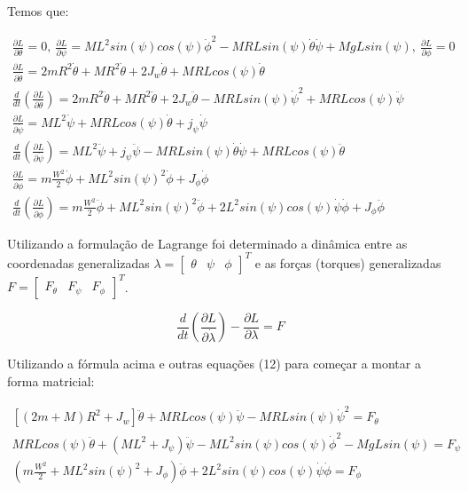 \documentclass[10pt]{article}
\begin{document}
\quad Temos que:

\begin{equation}
\begin{gathered}
    \frac{\partial L}{ \partial \theta} = 0, \ \frac{\partial L}{ \partial \psi} = ML^2sin(\psi)cos(\psi)\dot{\phi}^2 - MRLsin(\psi)\dot{\theta}\dot{\psi} + MgLsin(\psi), \ \frac{\partial L}{ \partial \phi} = 0 \\
    \frac{\partial L}{ \partial \dot{\theta}} = 2mR^2\dot{\theta} + MR^2\dot{\theta} + 2J_w\dot{\theta} + MRLcos(\psi)\dot{\theta} \\
    \frac{d}{dt} \left(\frac{\partial L}{ \partial \dot{\theta}}\right) = 2mR^2\ddot{\theta} + MR^2\ddot{\theta} + 2J_w\ddot{\theta} - MRLsin(\psi)\dot{\psi}^2 + MRLcos(\psi)\ddot{\psi} \\
    \frac{\partial L}{ \partial \dot{\psi}} = ML^2\dot{\psi} + MRLcos(\psi)\dot{\theta} + j_\psi \dot{\psi} \\
    \frac{d}{dt} \left(\frac{\partial L}{ \partial \dot{\psi}}\right) = ML^2\ddot{\psi} + j_\psi \ddot{\psi} - MRLsin(\psi)\dot{\theta}\dot{\psi} + MRLcos(\psi)\ddot{\theta} \\
    \frac{\partial L}{ \partial \dot{\phi}} = m\frac{W^2}{2}\dot{\phi} + ML^2sin(\psi)^2\dot{\phi} + J_\phi \dot{\phi} \\
    \frac{d}{dt} \left(\frac{\partial L}{ \partial \dot{\phi}}\right) = m\frac{W^2}{2}\ddot{\phi} + ML^2sin(\psi)^2\ddot{\phi} + 2L^2sin(\psi)cos(\psi)\dot\psi\dot\phi + J_\phi \ddot{\phi}
\end{gathered}
\end{equation}

\quad Utilizando a formulação de Lagrange foi determinado a dinâmica entre as coordenadas generalizadas $\lambda = \begin{bmatrix} \theta & \psi & \phi \end{bmatrix}^T$ e
as forças (torques) generalizadas $F = \begin{bmatrix} F_{\theta} & F_{\psi} & F_{\phi} \end{bmatrix}^T$.

\begin{equation}
    \frac{d}{dt}\left(\frac{\partial L}{\partial \dot{\lambda}}\right) - \frac{\partial L}{\partial \lambda} = F
\end{equation}

\quad Utilizando a fórmula acima e outras equações (12) para começar a montar a forma matricial:

\begin{equation}
\begin{gathered}
    \left[(2m + M)R^2 + J_w\right] \ddot{\theta} + MRLcos(\psi)\ddot{\psi} - MRLsin(\psi)\dot{\psi}^2 = F_{\theta} \\
    MRLcos(\psi)\ddot{\theta} + (ML^2 + J_\psi)\ddot{\psi} - ML^2sin(\psi)cos(\psi)\dot{\phi}^2 - MgLsin(\psi) = F_{\psi} \\
    \left(m\frac{W^2}{2} + ML^2sin(\psi)^2 + J_\phi\right)\ddot{\phi} + 2L^2sin(\psi)cos(\psi)\dot{\psi}\dot{\phi} = F_{\phi}
\end{gathered}
\end{equation}
\end{document}
